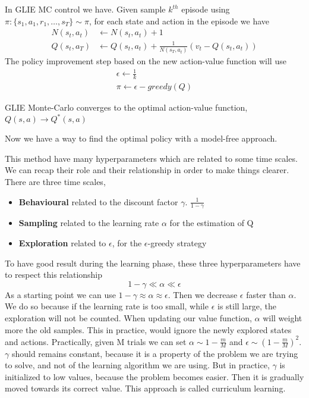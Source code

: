 \documentclass[main.tex]{subfiles}
\begin{document}
\par\noindent
In GLIE MC control we have. Given sample $k^{th}$ episode using $\pi:\{ s_1,a_1,r_1,\dots,s_T \} \sim \pi$, for each state and action in the episode we have
\begin{align*}
    N(s_t,a_t) &\leftarrow N(s_t,a_t) + 1 \\
    Q(s_t, a_T) &\leftarrow Q(s_t,a_t) + \frac{1}{N(s_T,a_t)}(v_t - Q(s_t,a_t))
\end{align*}
The policy improvement step based on the new action-value function will use
\begin{gather*}
    \epsilon \leftarrow \frac{1}{k} \\
    \pi \leftarrow \epsilon-greedy(Q)
\end{gather*}
\begin{theorem}
GLIE Monte-Carlo converges to the optimal action-value function, $Q(s,a) \rightarrow Q^*(s,a)$
\end{theorem}
Now we have a way to find the optimal policy with a model-free approach.
\par\noindent
This method have many hyperparameters which are related to some time scales. We can recap their role and their relationship in order to make things clearer. There are three time scales,
\begin{itemize}
    \item \textbf{Behavioural} related to the discount factor $\gamma$. $\frac{1}{1-\gamma}$
    \item \textbf{Sampling} related to the learning rate $\alpha$ for the estimation of Q
    \item \textbf{Exploration} related to $\epsilon$, for the $\epsilon$-greedy strategy
\end{itemize}
To have good result during the learning phase, these three hyperparameters have to respect this relationship
\begin{equation*}
    1-\gamma \ll \alpha \ll \epsilon
\end{equation*}
As a starting point we can use $1-\gamma \approx \alpha \approx \epsilon$. Then we decrease $\epsilon$ faster than $\alpha$. We do so because if the learning rate is too small, while $\epsilon$ is still large, the exploration will not be counted. When updating our value function, $\alpha$ will weight more the old samples. This in practice, would ignore the newly explored states and actions.
Practically, given M trials we can set $\alpha \sim 1- \frac{m}{M}$ and $\epsilon \sim (1-\frac{m}{M})^2$. $\gamma$ should remains constant, because it is a property of the problem we are trying to solve, and not of the learning algorithm we are using. But in practice, $\gamma$ is initialized to low values, because the problem becomes easier. Then it is gradually moved towards its correct value. This approach is called curriculum learning.
\end{document}
